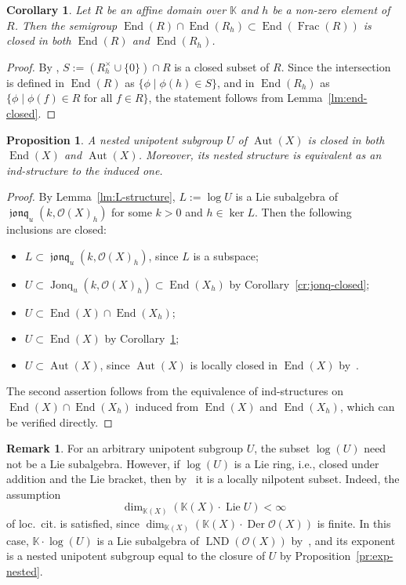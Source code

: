 \documentclass[12pt,a4paper]{amsart}
\theoremstyle{plain}
\newtheorem{proposition}[theorem]{Proposition}
\newtheorem{corollary}[theorem]{Corollary}
\theoremstyle{definition}
\newtheorem{remark}[theorem]{Remark}
\theoremstyle{remark}
\def\Aut{\operatorname{Aut}}
\def\End{\operatorname{End}}
\def\Der{\operatorname{Der}}
\def\LND{\operatorname{LND}}
\def\Frac{\operatorname{Frac}}
\def\Lie{\operatorname{Lie}}
\def\K{{\mathbb K}}
\def\cO{{\mathcal O}}
\DeclareMathOperator{\Jonq}{Jonq}
\DeclareMathOperator{\jonq}{\mathfrak{jonq}}
\begin{document}
\begin{corollary}\label{cr:local-closed}
   Let $R$ be an affine domain over $\K$ and $h$ be a non-zero element of $R$.
   Then the semigroup $\End(R)\cap\End(R_h)\subset\End(\Frac(R))$ is closed in both $\End(R)$ and $\End(R_h)$.
\end{corollary}
\begin{proof}
   By \cite[Theorem~4.1.1]{FK}, $S:= (R_h^\times \cup\{0\})\cap R$ is a closed subset of $R$. 
   Since the intersection is defined in $\End(R)$ as $\{\phi\mid \phi(h)\in S\}$, 
   and in $\End(R_h)$ as $\{\phi\mid \phi(f)\in R \text{ for all } f\in R\}$,
    the statement follows from Lemma~\ref{lm:end-closed}.
\end{proof}

\begin{proposition}\label{pr:unipotent-closed}
   A nested unipotent subgroup $U$ of $\Aut(X)$ is closed in both $\End(X)$ and $\Aut(X)$.
    Moreover, its nested structure is equivalent as an ind-structure to the induced one.
\end{proposition}
\begin{proof}
   By Lemma~\ref{lm:L-structure}, $L:=\log U$ is a Lie subalgebra 
   of $\jonq_u(k,\cO(X)_h)$ for some $k>0$ and $h\in\ker L$. 
   Then the following inclusions are closed:
   \begin{itemize}
      \item $L\subset \jonq_u(k,\cO(X)_h)$, since $L$ is a subspace;
      \item $U \subset \Jonq_u(k,\cO(X)_h)\subset \End(X_h)$ by Corollary~\ref{cr:jonq-closed};
      \item $U\subset \End(X)\cap \End(X_h)$;
      \item $U \subset \End(X)$ by Corollary~\ref{cr:local-closed};
      \item $U \subset \Aut(X)$, since $\Aut(X)$ is locally closed in $\End(X)$ by~\cite[Theorem~5.2.1]{FK}.
   \end{itemize}
   The second assertion follows from the equivalence of ind-structures on $\End(X)\cap\End(X_h)$ induced from $\End(X)$ and $\End(X_h)$, which can be verified directly.
\end{proof}

\begin{remark}\label{rm:Ga-closure} 
   For an arbitrary unipotent subgroup $U$, the subset $\log(U)$ need not be a Lie subalgebra.
   However, if $\log(U)$ is a Lie ring, i.e., closed under addition and the Lie bracket, then by~\cite[Theorem~1.5]{BPZ} it is a locally nilpotent subset.
   Indeed, the assumption 
   \[\dim_{\K(X)}(\K(X)\cdot\Lie U)<\infty\]
    of loc.\ cit. is satisfied, since $\dim_{\K(X)}(\K(X)\cdot\Der\cO(X))$ is finite.
   In this case, $\K\cdot\log(U)$ is a Lie subalgebra of $\LND(\cO(X))$ by~\cite[Corollary~1]{Skutin}, and its exponent is a nested unipotent subgroup equal to the closure of $U$ by Proposition~\ref{pr:exp-nested}. 
\end{remark} 
\end{document}
